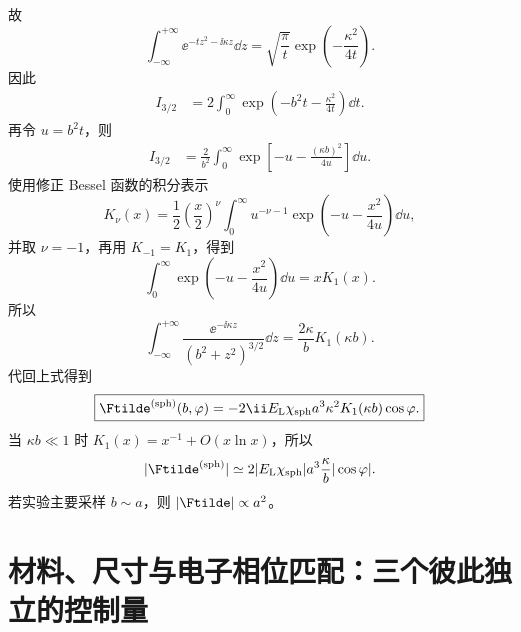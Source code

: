 故
\begin{equation}
\int_{-\infty}^{+\infty}
\ee^{-tz^2-\ii\kappa z}\dd z
=\sqrt{\frac{\pi}{t}}
\exp\!\left(-\frac{\kappa^2}{4t}\right).
\end{equation}
因此
\begin{align}
I_{3/2}
&=2\int_0^{\infty}
\exp\!\left(-b^2t-\frac{\kappa^2}{4t}\right)\dd t.
\end{align}
再令 $u=b^2t$，则
\begin{align}
I_{3/2}
&=\frac{2}{b^2}
\int_0^{\infty}
\exp\!\left[-u-\frac{(\kappa b)^2}{4u}\right]\dd u.
\end{align}
使用修正 Bessel 函数的积分表示
\begin{equation}
K_\nu(x)
=\frac12\left(\frac{x}{2}\right)^\nu
\int_0^{\infty}u^{-\nu-1}
\exp\!\left(-u-\frac{x^2}{4u}\right)\dd u,
\end{equation}
并取 $\nu=-1$，再用 $K_{-1}=K_1$，得到
\begin{equation}
\int_0^{\infty}
\exp\!\left(-u-\frac{x^2}{4u}\right)\dd u
=xK_1(x).
\end{equation}
所以
\begin{equation}
\boxed{
\int_{-\infty}^{+\infty}
\frac{\ee^{-\ii\kappa z}}{(b^2+z^2)^{3/2}}\dd z
=\frac{2\kappa}{b}K_1(\kappa b).}
\label{eq:K1-trajectory-transform}
\end{equation}
代回上式得到
\begin{equation}
\boxed{
\Ftilde^{(\rm sph)}(b,\varphi)
=-2\ii E_{\rm L}\chi_{\rm sph}a^3
\kappa^2K_1(\kappa b)\cos\varphi.}
\label{eq:F-sphere-general}
\end{equation}
当 $\kappa b\ll1$ 时 $K_1(x)=x^{-1}+O(x\ln x)$，所以
\begin{equation}
|\Ftilde^{(\rm sph)}|
\simeq
2|E_{\rm L}\chi_{\rm sph}|a^3
\frac{\kappa}{b}|\cos\varphi|.
\label{eq:F-sphere-small-kappa}
\end{equation}
若实验主要采样 $b\sim a$，则 $|\Ftilde|\propto a^2$。


\section{材料、尺寸与电子相位匹配：三个彼此独立的控制量}


